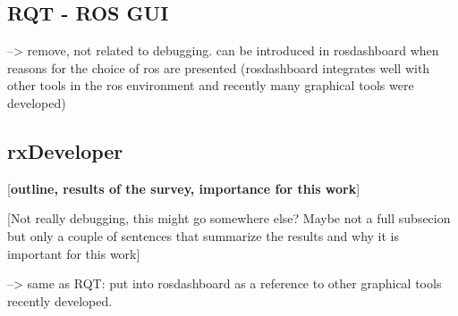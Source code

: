 \subsection{RQT - ROS GUI}
--> remove, not related to debugging. can be introduced in rosdashboard when reasons for the choice of ros are presented (rosdashboard integrates well with other tools in the ros environment and recently many graphical tools were developed)
\subsection{rxDeveloper}
[\textbf{outline, results of the survey, importance for this work}]
\cite{Muellers2012}

[Not really debugging, this might go somewhere else? Maybe not a full subsecion but only a couple of sentences that summarize the results and why it is important for this work]

--> same as RQT: put into rosdashboard as a reference to other graphical tools recently developed.


